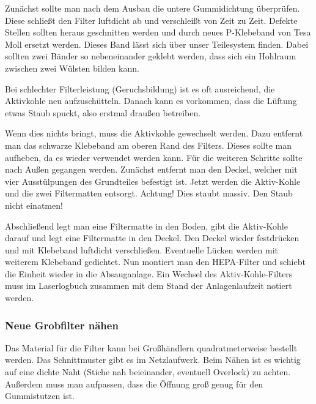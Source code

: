\documentclass{\basedir/fablab-document}
\begin{document}
	Zunächst sollte man nach dem Ausbau die untere Gummidichtung überprüfen. Diese schließt den Filter luftdicht ab und verschleißt von Zeit zu Zeit. Defekte Stellen sollten heraus geschnitten werden und durch neues P-Klebeband von Tesa Moll ersetzt werden. Dieses Band lässt sich über unser Teilesystem finden. Dabei sollten zwei Bänder so nebeneinander geklebt werden, dass sich ein Hohlraum zwischen zwei Wülsten bilden kann.

	Bei schlechter Filterleistung (Geruchsbildung) ist es oft ausreichend, die Aktivkohle neu aufzuschütteln. Danach kann es vorkommen, dass die Lüftung etwas Staub spuckt, also erstmal draußen betreiben.

	Wenn dies nichts bringt, muss die Aktivkohle gewechselt werden. Dazu entfernt man das schwarze Klebeband am oberen Rand des Filters. Dieses sollte man aufheben, da es wieder verwendet werden kann. Für die weiteren Schritte sollte nach Außen gegangen werden. Zunächst entfernt man den Deckel, welcher mit vier Ausstülpungen des Grundteiles befestigt ist. Jetzt werden die Aktiv-Kohle und die zwei Filtermatten entsorgt. Achtung! Dies staubt massiv. Den Staub nicht einatmen!

	Abschließend legt man eine Filtermatte in den Boden, gibt die Aktiv-Kohle darauf und legt eine Filtermatte in den Deckel. Den Deckel wieder festdrücken und mit Klebeband luftdicht verschließen. Eventuelle Lücken werden mit weiterem Klebeband gedichtet. Nun montiert man den HEPA-Filter und schiebt die Einheit wieder in die Absauganlage.
	Ein Wechsel des Aktiv-Kohle-Filters muss im Laserlogbuch zusammen mit dem Stand der Anlagenlaufzeit notiert werden.
	\subsubsection{Neue Grobfilter nähen}
	Das Material für die Filter kann bei Großhändlern quadratmeterweise bestellt werden. Das Schnittmuster gibt es im Netzlaufwerk. Beim Nähen ist es wichtig auf eine dichte Naht (Stiche nah beieinander, eventuell Overlock) zu achten. Außerdem muss man aufpassen, dass die Öffnung groß genug für den Gummistutzen ist.
\end{document}
